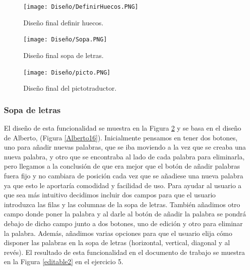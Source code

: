 \begin{figure}[ht!]
  \centering
  \texttt{[image: Diseño/DefinirHuecos.PNG]}
  \caption{Diseño final definir huecos.}
  \label{definir_hueco}
\end{figure}

\begin{figure}[ht!]
  \centering
  \texttt{[image: Diseño/Sopa.PNG]}
  \caption{Diseño final sopa de letras.}
  \label{sopaLetras}
\end{figure}

\begin{figure}[ht!]
  \centering
  \texttt{[image: Diseño/picto.PNG]}
  \caption{Diseño final del pictotraductor.}
  \label{pictotraductor}
\end{figure}
\subsubsection{Sopa de letras}
El diseño de esta funcionalidad se muestra en la Figura \ref{sopaLetras} y se basa en el diseño de Alberto, (Figura \ref{Alberto16}). Inicialmente pensamos en tener dos botones, uno para añadir nuevas palabras, que se iba moviendo a la vez que se creaba una nueva palabra, y otro que se encontraba al lado de cada palabra para eliminarla, pero llegamos a la conclusión
de que era mejor que el botón de añadir palabras fuera fijo y no cambiara de posición cada vez que se añadiese una nueva palabra ya que esto le aportaría comodidad y facilidad de uso. Para ayudar al usuario a que sea más intuitivo decidimos incluir dos campos para que el usuario introduzca las filas y las columnas de la sopa de letras. También añadimos otro campo donde poner la palabra y al darle al botón de añadir la palabra se pondrá debajo de dicho campo junto a dos botones, uno de edición y otro para eliminar la palabra. Además, añadimos varias opciones para que el usuario elija cómo disponer las palabras en la sopa de letras (horizontal, vertical, diagonal y al revés). El resultado de esta funcionalidad en el documento de trabajo se muestra en la Figura \ref{editable2} en el ejercicio 5.



